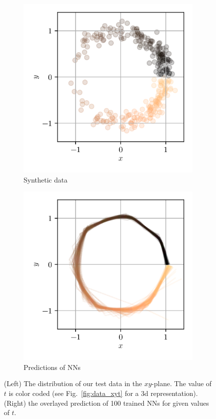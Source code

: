 \documentclass{article}
\begin{document}
\begin{figure}[htbp]
    \centering
    \begin{subfigure}{.49\textwidth}
        \centering
        \includegraphics[scale=.8]{data_xy.png}
        \caption{Synthetic data}
        \label{fig:data}
    \end{subfigure}
    \begin{subfigure}{.49\textwidth}
        \centering
        \includegraphics[scale=.8]{model_xy.png}
        \caption{Predictions of NNs}
        \label{fig:predictions}
    \end{subfigure}
    \caption{(Left) The distribution of our test data in the $xy$-plane. The value of $t$ is color coded (see Fig.~\ref{fig:data_xyt} for a 3d representation). (Right) the overlayed prediction of 100 trained NNs for given values of $t$.}
\end{figure}
\end{document}
